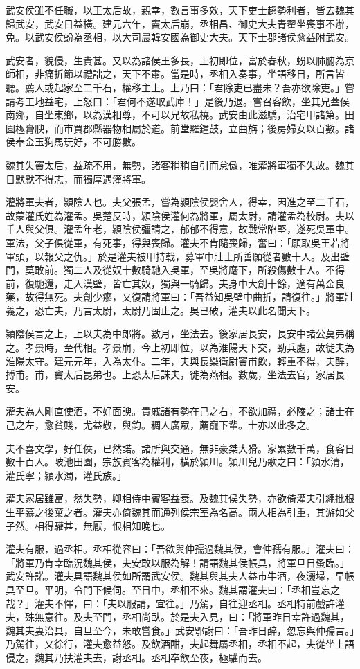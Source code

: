 \begin{pinyinscope}
武安侯雖不任職，以王太后故，親幸，數言事多效，天下吏士趨勢利者，皆去魏其歸武安，武安日益橫。建元六年，竇太后崩，丞相昌、御史大夫青翟坐喪事不辦，免。以武安侯蚡為丞相，以大司農韓安國為御史大夫。天下士郡諸侯愈益附武安。

武安者，貌侵，生貴甚。又以為諸侯王多長，上初即位，富於春秋，蚡以肺腑為京師相，非痛折節以禮詘之，天下不肅。當是時，丞相入奏事，坐語移日，所言皆聽。薦人或起家至二千石，權移主上。上乃曰：「君除吏已盡未？吾亦欲除吏。」嘗請考工地益宅，上怒曰：「君何不遂取武庫！」是後乃退。嘗召客飲，坐其兄蓋侯南鄉，自坐東鄉，以為漢相尊，不可以兄故私橈。武安由此滋驕，治宅甲諸第。田園極膏腴，而市買郡縣器物相屬於道。前堂羅鐘鼓，立曲旃；後房婦女以百數。諸侯奉金玉狗馬玩好，不可勝數。

魏其失竇太后，益疏不用，無勢，諸客稍稍自引而怠傲，唯灌將軍獨不失故。魏其日默默不得志，而獨厚遇灌將軍。

灌將軍夫者，潁陰人也。夫父張孟，嘗為潁陰侯嬰舍人，得幸，因進之至二千石，故蒙灌氏姓為灌孟。吳楚反時，潁陰侯灌何為將軍，屬太尉，請灌孟為校尉。夫以千人與父俱。灌孟年老，潁陰侯彊請之，郁郁不得意，故戰常陷堅，遂死吳軍中。軍法，父子俱從軍，有死事，得與喪歸。灌夫不肯隨喪歸，奮曰：「願取吳王若將軍頭，以報父之仇。」於是灌夫被甲持戟，募軍中壯士所善願從者數十人。及出壁門，莫敢前。獨二人及從奴十數騎馳入吳軍，至吳將麾下，所殺傷數十人。不得前，復馳還，走入漢壁，皆亡其奴，獨與一騎歸。夫身中大創十餘，適有萬金良藥，故得無死。夫創少瘳，又復請將軍曰：「吾益知吳壁中曲折，請復往。」將軍壯義之，恐亡夫，乃言太尉，太尉乃固止之。吳已破，灌夫以此名聞天下。

潁陰侯言之上，上以夫為中郎將。數月，坐法去。後家居長安，長安中諸公莫弗稱之。孝景時，至代相。孝景崩，今上初即位，以為淮陽天下交，勁兵處，故徙夫為淮陽太守。建元元年，入為太仆。二年，夫與長樂衛尉竇甫飲，輕重不得，夫醉，搏甫。甫，竇太后昆弟也。上恐太后誅夫，徙為燕相。數歲，坐法去官，家居長安。

灌夫為人剛直使酒，不好面諛。貴戚諸有勢在己之右，不欲加禮，必陵之；諸士在己之左，愈貧賤，尤益敬，與鈞。稠人廣眾，薦寵下輩。士亦以此多之。

夫不喜文學，好任俠，已然諾。諸所與交通，無非豪桀大猾。家累數千萬，食客日數十百人。陂池田園，宗族賓客為權利，橫於潁川。潁川兒乃歌之曰：「潁水清，灌氏寧；潁水濁，灌氏族。」

灌夫家居雖富，然失勢，卿相侍中賓客益衰。及魏其侯失勢，亦欲倚灌夫引繩批根生平慕之後棄之者。灌夫亦倚魏其而通列侯宗室為名高。兩人相為引重，其游如父子然。相得驩甚，無厭，恨相知晚也。

灌夫有服，過丞相。丞相從容曰：「吾欲與仲孺過魏其侯，會仲孺有服。」灌夫曰：「將軍乃肯幸臨況魏其侯，夫安敢以服為解！請語魏其侯帳具，將軍旦日蚤臨。」武安許諾。灌夫具語魏其侯如所謂武安侯。魏其與其夫人益市牛酒，夜灑埽，早帳具至旦。平明，令門下候伺。至日中，丞相不來。魏其謂灌夫曰：「丞相豈忘之哉？」灌夫不懌，曰：「夫以服請，宜往。」乃駕，自往迎丞相。丞相特前戲許灌夫，殊無意往。及夫至門，丞相尚臥。於是夫入見，曰：「將軍昨日幸許過魏其，魏其夫妻治具，自旦至今，未敢嘗食。」武安鄂謝曰：「吾昨日醉，忽忘與仲孺言。」乃駕往，又徐行，灌夫愈益怒。及飲酒酣，夫起舞屬丞相，丞相不起，夫從坐上語侵之。魏其乃扶灌夫去，謝丞相。丞相卒飲至夜，極驩而去。


\end{pinyinscope}

